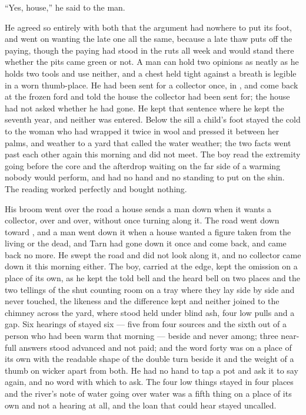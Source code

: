 “Yes, house,” he said to the man.

He agreed so entirely with both that the argument had nowhere to put its foot, and went on wanting the late one all the same, because a late thaw puts off the paying, though the paying had stood in the ruts all week and would stand there whether the pits came green or not. A man can hold two opinions as neatly as he holds two tools and use neither, and a chest held tight against a breath is legible in a worn thumb-place. He had been sent for a collector once, in , and come back at the frozen ford and told the house the collector had been sent for; the house had not asked whether he had gone. He kept that sentence where he kept the seventh year, and neither was entered. Below the sill a child’s foot stayed the cold to the woman who had wrapped it twice in wool and pressed it between her palms, and weather to a yard that called the water weather; the two facts went past each other again this morning and did not meet. The boy read the extremity going before the core and the afterdrop waiting on the far side of a warming nobody would perform, and had no hand and no standing to put on the shin. The reading worked perfectly and bought nothing.

His broom went over the road a house sends a man down when it wants a collector, over and over, without once turning along it. The road went down toward , and a man went down it when a house wanted a figure taken from the living or the dead, and Tarn had gone down it once and come back, and came back no more. He swept the road and did not look along it, and no collector came down it this morning either. The boy, carried at the edge, kept the omission on a place of its own, as he kept the told bell and the heard bell on two places and the two tellings of the shut counting room on a tray where they lay side by side and never touched, the likeness and the difference kept and neither joined to the chimney across the yard, where  stood held under blind ash, four low pulls and a gap. Six hearings of  stayed six — five from four sources and the sixth out of a person who had been warm that morning — beside and never among; three near-full answers stood advanced and not paid; and the word forty was on a place of its own with the readable shape of the double turn beside it and the weight of a thumb on wicker apart from both. He had no hand to tap a pot and ask it to say again, and no  word with which to ask. The four low things stayed in four places and the river’s note of water going over water was a fifth thing on a place of its own and not a hearing at all, and the loan that could hear stayed uncalled.

